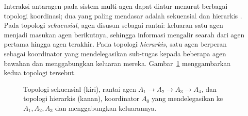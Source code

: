Interaksi antaragen pada sistem multi-agen dapat diatur menurut berbagai
topologi koordinasi; dua yang paling mendasar adalah sekuensial dan
hierarkis \citep{wooldridge2009}. Pada topologi \textit{sekuensial}, agen
disusun sebagai rantai: keluaran satu agen menjadi masukan agen berikutnya,
sehingga informasi mengalir searah dari agen pertama hingga agen terakhir.
Pada topologi \textit{hierarkis}, satu agen berperan sebagai koordinator
yang mendelegasikan sub-tugas kepada beberapa agen bawahan dan
menggabungkan keluaran mereka. Gambar~\ref{fig:topologi} menggambarkan
kedua topologi tersebut.

\begin{figure}[H]
\centering
{}
\caption{Topologi sekuensial (kiri), rantai agen $A_1\to A_2\to A_3\to
A_4$, dan topologi hierarkis (kanan), koordinator $A_0$ yang
mendelegasikan ke $A_1,A_2,A_3$ dan menggabungkan keluarannya.}
\label{fig:topologi}
\end{figure}
